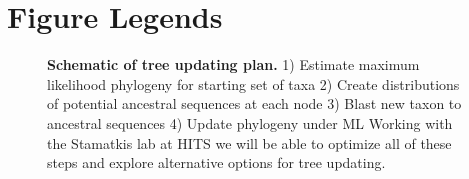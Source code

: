 \documentclass[10pt]{article}
\begin{document}
%


\section*{Figure Legends}
\begin{figure}[!ht]
\begin{center}
\end{center}
\caption{
{\bf Schematic of tree updating plan. }  1) Estimate maximum likelihood phylogeny for starting set of taxa 2) Create distributions of potential ancestral sequences at each node 3) Blast new taxon to ancestral sequences 4) Update phylogeny under ML Working with the Stamatkis lab at HITS we will be able to optimize all of these steps and explore alternative options for tree updating.
}
\label{Figure_label}
\end{figure}
\end{document}
